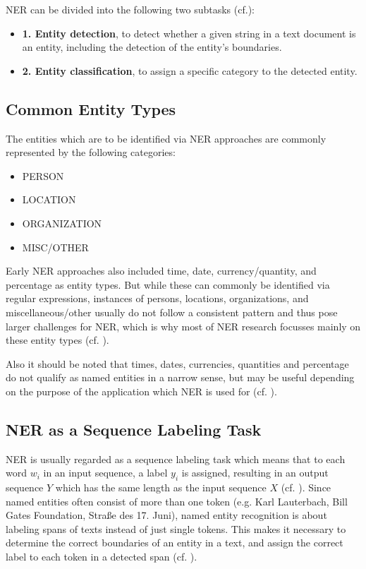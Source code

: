 NER can be divided into the following two subtasks (cf.\cite[229]{zong_information_2021}):
\begin{itemize}
	\item \textbf{1. Entity detection}, to detect whether a given string in a text document is an entity, including the detection of the entity's boundaries.
	\item \textbf{2. Entity classification}, to assign a specific category to the detected entity. 
 \end{itemize}
 
\subsection{Common Entity Types}
The entities which are to be identified via NER approaches are commonly represented by the following categories: 

\begin{itemize}
\item PERSON
\item LOCATION
\item ORGANIZATION
\item MISC/OTHER
\end{itemize}
 
Early NER approaches also included time, date, currency/quantity, and percentage as entity types.  But while these can commonly be identified via regular expressions, instances of persons, locations, organizations, and miscellaneous/other usually do not follow a consistent pattern and thus pose larger challenges for NER, which is why most of NER research focusses mainly on these entity types (cf. \cite[229]{zong_information_2021}).

Also it should be noted that times, dates, currencies, quantities and percentage do not qualify as named entities in a narrow sense, but may be useful depending on the purpose of the application which NER is used for (cf. \cite[386]{aggarwal_machine_2018}).

\subsection{NER as a Sequence Labeling Task}
NER is usually regarded as a sequence labeling task which means that to each word $w_i$ in an input sequence, a label $y_i$ is assigned, resulting in an output sequence $Y$ which has the same length as the input sequence $X$ (cf. \cite[1]{jurafsky_2021_8}). Since named entities often consist of more than one token (e.g. Karl Lauterbach, Bill Gates Foundation, Straße des 17. Juni), named entity recognition is about labeling spans of texts instead of just single tokens. This makes it necessary to determine the correct boundaries of an entity in a text, and assign the correct label to each token in a detected span (cf. \cite[6-7]{jurafsky_2021_8}). 

